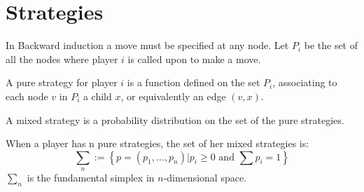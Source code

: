 \section{Strategies}

In Backward induction a move must be specified at any node.
Let $P_i$ be the set of all the nodes where player $i$ is called upon to make a move.
\begin{definition}
    A pure strategy for player $i$ is a function defined on the set $P_i$, associating to each node $v$ in $P_i$ a child $x$, or equivalently an edge $(v, x)$.
\end{definition}
\begin{definition}
    A mixed strategy is a probability distribution on the set of the pure strategies. 
\end{definition}
When a player has n pure strategies, the set of her mixed strategies is: 
\[\sum_n:=\left\{p=(p_1,\dots,p_n)|p_i\geq 0 \text{ and }\sum{p_i}=1\right\}\]
$\sum_n$ is the fundamental simplex in $n$-dimensional space. 

